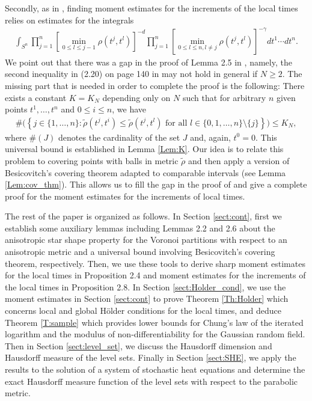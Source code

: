 \documentclass[11pt, reqno]{amsart}
\numberwithin{equation}{section}
\begin{document}
Secondly, as in \cite{X97}, finding moment estimates for the increments of the local times relies on estimates for the integrals
\begin{align*}
\int_{S^n} \prod_{j=1}^n \left[ \min_{0 \le l \le j-1} \rho(t^j, t^l)\right]^{-d} 
\prod_{j=1}^n \left[ \min_{0 \le l \le n, l \ne j} \rho(t^j, t^l)\right]^{-\gamma}  dt^1 \cdots dt^n.
\end{align*}
We point out that there was a gap in the proof of Lemma 2.5 in \cite{X97}, namely, the second inequality in (2.20) on page 140 
in \cite{X97} may not hold in general if $N \ge 2$. The missing part that is needed in order to complete the proof is the following: 
There exists a constant $K = K_N$ depending only on $N$ such that for arbitrary $n$ given points $ t^1, \dots, t^n$ and 
$0 \le i \le n$, we have
\begin{align*}
\# \big(\left\{ j \in \{1, \dots, n\} : \tilde\rho(t^j, t^i) \le \tilde\rho(t^j, t^l) \text{ for all } l \in \{0, 1, \dots, n\} \setminus \{j\} \right\}
\big) \le K_N,
\end{align*}
where $\# (J)$ denotes the cardinality of the set $J$ and, again, $t^0 = 0$. This universal bound is established in Lemma \ref{Lem:K}. 
Our idea is to relate this problem to covering points with 
balls in metric $\tilde\rho$ and then apply a version of  Besicovitch's covering theorem adapted to comparable intervals 
(see Lemma \ref{Lem:cov_thm}). This allows us to fill the gap in the proof of \cite{X97} and give a complete proof for 
the moment estimates for the increments of local times.

The rest of the paper is organized as follows. In Section \ref{sect:cont},  first we establish some auxiliary lemmas including 
Lemmas 2.2 and 2.6 about the anisotropic star shape property for the Voronoi partitions with respect to an anisotropic metric 
and a universal bound involving Besicovitch's covering theorem, respectively.
Then, we use these tools to derive sharp moment estimates for the local times 
in Proposition 2.4 and moment estimates for the increments of the local times in Proposition 2.8.
In Section \ref{sect:Holder_cond}, we use the moment estimates in Section \ref{sect:cont} to prove Theorem \ref{Th:Holder} which concerns local and global H\"{o}lder conditions for the local times, and deduce Theorem \ref{T:sample} which provides lower bounds for Chung's law of the iterated logarithm and the modulus of non-differentiability for the Gaussian random field.
Then in Section \ref{sect:level_set}, we discuss the Hausdorff dimension and Hausdorff measure of the level sets.
Finally in Section \ref{sect:SHE}, we apply the results to the solution of a system of stochastic heat equations and 
determine the exact Hausdorff measure function of the level sets with respect to the parabolic metric.
\end{document}
